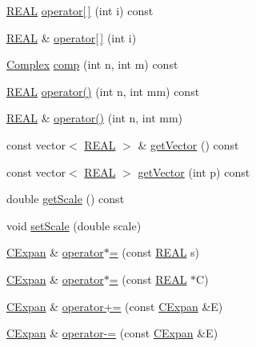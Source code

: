 \begin{DoxyCompactItemize}
\item 
\hyperlink{util_8h_a5821460e95a0800cf9f24c38915cbbde}{R\-E\-A\-L} \hyperlink{classCExpan_a320228753bd00097b31017fbbc0564ca}{operator\mbox{[}$\,$\mbox{]}} (int i) const 
\item 
\hyperlink{util_8h_a5821460e95a0800cf9f24c38915cbbde}{R\-E\-A\-L} \& \hyperlink{classCExpan_af4292c53f4cdd9856b5e42c26e1231ce}{operator\mbox{[}$\,$\mbox{]}} (int i)
\item 
\hyperlink{util_8h_a0ef19d29521fc1e3356ea268ba175cfc}{Complex} \hyperlink{classCExpan_a4ffcff1d5e9bb8e93587f86871808fde}{comp} (int n, int m) const 
\item 
\hyperlink{util_8h_a5821460e95a0800cf9f24c38915cbbde}{R\-E\-A\-L} \hyperlink{classCExpan_ad161884680e4926b1425d65c26239610}{operator()} (int n, int mm) const 
\item 
\hyperlink{util_8h_a5821460e95a0800cf9f24c38915cbbde}{R\-E\-A\-L} \& \hyperlink{classCExpan_a72b76c1c1448f9fd55f384e20443e821}{operator()} (int n, int mm)
\item 
const vector$<$ \hyperlink{util_8h_a5821460e95a0800cf9f24c38915cbbde}{R\-E\-A\-L} $>$ \& \hyperlink{classCExpan_ad7f40483437c9d78f5353843b381ddd8}{get\-Vector} () const 
\item 
const vector$<$ \hyperlink{util_8h_a5821460e95a0800cf9f24c38915cbbde}{R\-E\-A\-L} $>$ \hyperlink{classCExpan_aea4a9b2183cf94572429330c6a3cdb54}{get\-Vector} (int p) const 
\item 
double \hyperlink{classCExpan_a849c5d81bbc37ea52dd660d5950f264c}{get\-Scale} () const 
\item 
void \hyperlink{classCExpan_aa36e147d92fd44b430f8962b2f358e8d}{set\-Scale} (double scale)
\item 
\hyperlink{classCExpan}{C\-Expan} \& \hyperlink{classCExpan_a6310d334b4ed3b3edb9cde827092c5b3}{operator$\ast$=} (const \hyperlink{util_8h_a5821460e95a0800cf9f24c38915cbbde}{R\-E\-A\-L} s)
\item 
\hyperlink{classCExpan}{C\-Expan} \& \hyperlink{classCExpan_a862fc4cbc571689e4e0e1e5ba74f990f}{operator$\ast$=} (const \hyperlink{util_8h_a5821460e95a0800cf9f24c38915cbbde}{R\-E\-A\-L} $\ast$C)
\item 
\hyperlink{classCExpan}{C\-Expan} \& \hyperlink{classCExpan_a25b49493b32656ff9caeeecd74566170}{operator+=} (const \hyperlink{classCExpan}{C\-Expan} \&E)
\item 
\hyperlink{classCExpan}{C\-Expan} \& \hyperlink{classCExpan_ae438fdfbb6573bb8036bd3413fbb1996}{operator-\/=} (const \hyperlink{classCExpan}{C\-Expan} \&E)

\end{DoxyCompactItemize}
